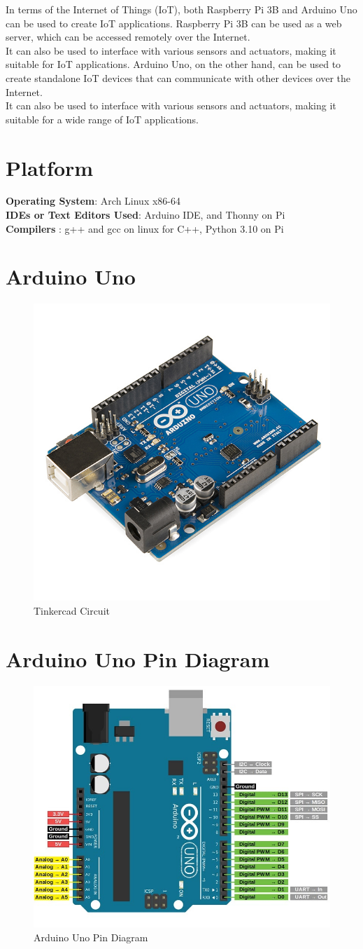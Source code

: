 \documentclass[11pt]{article}
\begin{document}
In terms of the Internet of Things (IoT), both Raspberry Pi 3B and Arduino Uno can be used to create IoT applications. Raspberry Pi 3B can be used as a web server, which can be accessed remotely over the Internet. \\

It can also be used to interface with various sensors and actuators, making it suitable for IoT applications. Arduino Uno, on the other hand, can be used to create standalone IoT devices that can communicate with other devices over the Internet. \\

It can also be used to interface with various sensors and actuators, making it suitable for a wide range of IoT applications.


\section{Platform}
\textbf{Operating System}: Arch Linux x86-64 \\
\textbf{IDEs or Text Editors Used}: Arduino IDE, and Thonny on Pi\\
\textbf{Compilers} : g++ and gcc on linux for C++, Python 3.10 on Pi\\

\section{Arduino Uno}
\begin{figure}[H]
	\centering
	\includegraphics[width=.45\textwidth]{Arduino_Uno_-_R3.jpg}
	\caption{Tinkercad Circuit}
\end{figure}
\section{Arduino Uno Pin Diagram}
\begin{figure}[H]
	\centering
	\includegraphics[width=.55\textwidth]{1-3.jpg}
	\caption{Arduino Uno Pin Diagram}
\end{figure}
\end{document}
